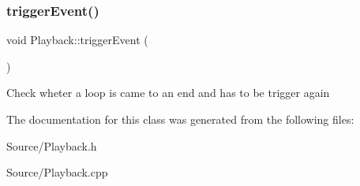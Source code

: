 \subsubsection{\texorpdfstring{triggerEvent()}{triggerEvent()}}
{\footnotesize\ttfamily void Playback\+::trigger\+Event (\begin{DoxyParamCaption}{ }\end{DoxyParamCaption})}

Check wheter a loop is came to an end and has to be trigger again 

The documentation for this class was generated from the following files\+:\begin{DoxyCompactItemize}
\item 
Source/Playback.\+h\item 
Source/Playback.\+cpp\end{DoxyCompactItemize}
